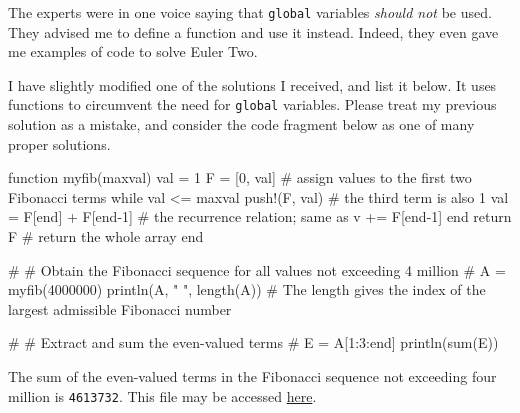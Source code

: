 \documentclass[
  a4paper,
]{article}
\newenvironment{Shaded}{\begin{snugshade}}{\end{snugshade}}
\newcommand{\CommentTok}[1]{\textcolor[rgb]{0.50,0.62,0.50}{#1}}
\newcommand{\ControlFlowTok}[1]{\textcolor[rgb]{0.94,0.87,0.69}{#1}}
\newcommand{\FloatTok}[1]{\textcolor[rgb]{0.75,0.75,0.82}{#1}}
\newcommand{\FunctionTok}[1]{\textcolor[rgb]{0.94,0.94,0.56}{#1}}
\newcommand{\KeywordTok}[1]{\textcolor[rgb]{0.94,0.87,0.69}{#1}}
\newcommand{\NormalTok}[1]{\textcolor[rgb]{0.80,0.80,0.80}{#1}}
\newcommand{\OperatorTok}[1]{\textcolor[rgb]{0.94,0.94,0.82}{#1}}
\newcommand{\StringTok}[1]{\textcolor[rgb]{0.80,0.58,0.58}{#1}}
\begin{document}
The experts were in one voice saying that \texttt{global} variables
\emph{should not} be used. They advised me to define a function and use
it instead. Indeed, they even gave me examples of code to solve Euler
Two.

I have slightly modified one of the solutions I received, and list it
below. It uses functions to circumvent the need for \texttt{global}
variables. Please treat my previous solution as a mistake, and consider
the code fragment below as one of many proper solutions.

\begin{Shaded}
\begin{Highlighting}[]
\KeywordTok{function} \FunctionTok{myfib}\NormalTok{(maxval)}
\NormalTok{    val }\OperatorTok{=} \FloatTok{1}
\NormalTok{    F }\OperatorTok{=}\NormalTok{ [}\FloatTok{0}\NormalTok{, val] }\CommentTok{\# assign values to the first two Fibonacci terms}
    \ControlFlowTok{while}\NormalTok{ val }\OperatorTok{\textless{}=}\NormalTok{ maxval}
        \FunctionTok{push!}\NormalTok{(F, val) }\CommentTok{\# the third term is also 1}
\NormalTok{        val }\OperatorTok{=}\NormalTok{ F[}\KeywordTok{end}\NormalTok{] }\OperatorTok{+}\NormalTok{ F[}\KeywordTok{end}\OperatorTok{{-}}\FloatTok{1}\NormalTok{] }\CommentTok{\# the recurrence relation; same as v += F[end{-}1]}
    \ControlFlowTok{end}
    \ControlFlowTok{return}\NormalTok{ F }\CommentTok{\# return the whole array}
\KeywordTok{end}

\CommentTok{\#}
\CommentTok{\# Obtain the Fibonacci sequence for all values not exceeding 4 million}
\CommentTok{\#}
\NormalTok{A }\OperatorTok{=} \FunctionTok{myfib}\NormalTok{(}\FloatTok{4000000}\NormalTok{)}
\FunctionTok{println}\NormalTok{(A, }\StringTok{" "}\NormalTok{, }\FunctionTok{length}\NormalTok{(A)) }\CommentTok{\# The length gives the index of the largest admissible Fibonacci number}

\CommentTok{\#}
\CommentTok{\# Extract and sum the even{-}valued terms}
\CommentTok{\#}
\NormalTok{E }\OperatorTok{=}\NormalTok{ A[}\FloatTok{1}\OperatorTok{:}\FloatTok{3}\OperatorTok{:}\KeywordTok{end}\NormalTok{]}
\FunctionTok{println}\NormalTok{(}\FunctionTok{sum}\NormalTok{(E))}
\end{Highlighting}
\end{Shaded}

The sum of the even-valued terms in the Fibonacci sequence not exceeding
four million is \texttt{4613732}. This file may be accessed
\href{auxiliary/even-f-sum.jl}{here}.
\end{document}
